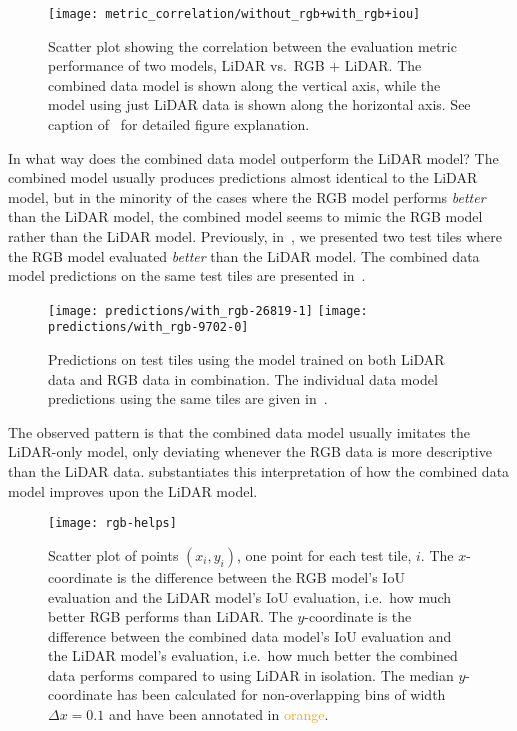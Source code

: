 \begin{figure}[H]
  \centering
  \texttt{[image: metric\_correlation/without\_rgb+with\_rgb+iou]}
  \caption{%
    Scatter plot showing the correlation between the evaluation metric performance of two models, LiDAR vs.\ RGB + LiDAR\@.
    The combined data model is shown along the vertical axis, while the model using just LiDAR data is shown along the horizontal axis.
    See caption of~ for detailed figure explanation.
  }%
  \label{fig:lidar-combined-correlation}
\end{figure}

In what way does the combined data model outperform the LiDAR model?
The combined model usually produces predictions almost identical to the LiDAR model, but in the minority of the cases where the RGB model performs \emph{better} than the LiDAR model, the combined model seems to mimic the RGB model rather than the LiDAR model.
Previously, in~, we presented two test tiles where the RGB model evaluated \emph{better} than the LiDAR model.
The combined data model predictions on the same test tiles are presented in~.

\begin{figure}[H]
  \centering
  \texttt{[image: predictions/with\_rgb-26819-1]}  %
  \textcolor{gray}{\vrule}
  \texttt{[image: predictions/with\_rgb-9702-0]}  %
  \caption{%
    Predictions on test tiles using the model trained on both LiDAR data and RGB data in combination.
    The individual data model predictions using the same tiles are given in~.
  }%
  \label{fig:rgb-selection}
\end{figure}

The observed pattern is that the combined data model usually imitates the LiDAR-only model, only deviating whenever the RGB data is more descriptive than the LiDAR data.
 substantiates this interpretation of how the combined data model improves upon the LiDAR model.

\begin{figure}[H]
  \centering
  \texttt{[image: rgb-helps]}
  \caption{%
    Scatter plot of points $(x_i, y_i)$, one point for each test tile, $i$.
    The $x$-coordinate is the difference between the RGB model's IoU evaluation and the LiDAR model's IoU evaluation, i.e.\ how much better RGB performs than LiDAR.
    The $y$-coordinate is the difference between the combined data model's IoU evaluation and the LiDAR model's evaluation, i.e.\ how much better the combined data performs compared to using LiDAR in isolation.
    The median $y$-coordinate has been calculated for non-overlapping bins of width $\Delta x = \num{0.1}$ and have been annotated in \textcolor{orange}{orange}.
  }%
  \label{fig:rgb-help}
\end{figure}

